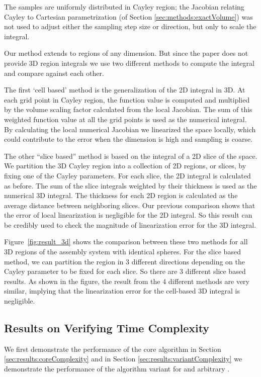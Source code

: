 \documentclass[]{article}
\newcommand{\figref}[1]{Figure~\ref{#1}}
\begin{document}
The samples are uniformly distributed in Cayley region; the Jacobian relating
Cayley to Cartesian parametrization (of Section \ref{sec:methods:exactVolume})
was not used to adjust either the sampling
step size or direction, but only to scale the integral.

Our method extends to regions of any dimension. But since the paper
\cite{Holmes-Cerfon2013} does not provide 3D region integrals we use two
different methods to compute the integral and compare against each other.

The first `cell based' method is the generalization of the 2D integral in 3D. At
each grid point in Cayley region, the function value is computed and multiplied
by the volume scaling factor calculated from the local Jacobian. The sum of
this weighted function value at all the grid points is used as the numerical integral.
By calculating the local numerical Jacobian we linearized the space locally, which
could contribute to the error when the dimension is high and sampling
is coarse.

The other ``slice based'' method is based on the integral of a 2D slice of the
space. We partition the 3D Cayley region into a collection of 2D regions, or
slices, by fixing one of the Cayley parameters. For each slice, the 2D integral
is calculated as before. The sum of the slice integrals weighted by
their thickness is used as the numerical 3D integral. The thickness for each
2D region is calculated as the average distance between neighboring slices. Our
previous comparison shows that the error of local linearization is
negligible for the 2D integral. So this result can be credibly used to check
the magnitude of linearization error for the 3D integral.

\figref{fig:result_3d} shows the comparison between these two methods for all
3D regions of the  assembly system with  identical spheres. For the slice
based method, we can partition the region in 3 different directions depending
on the Cayley parameter to be fixed for each slice. So there are 3 different
slice based results. As shown in the figure, the result from the 4 different
methods are very similar, implying that the linearization error for the cell-based
3D integral is negligible.

\subsection{Results on Verifying Time Complexity}
\label{sec:results:complexity}
We first demonstrate the performance of the core algorithm in 
Section \ref{sec:results:coreComplexity} and in Section \ref{sec:results:variantComplexity}
we demonstrate the performance of the algorithm variant for  and arbitrary .
\end{document}
